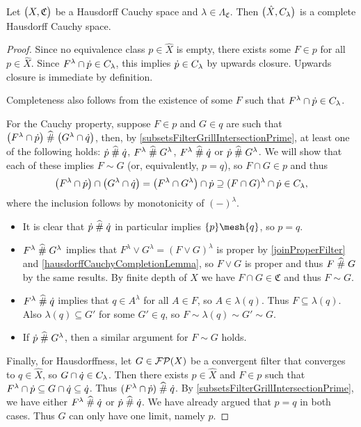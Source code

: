 \begin{proposition}
Let $\sSet[\big]{X, \mathfrak{C}}$ be a Hausdorff Cauchy space and $\lambda \in \Lambda_\mathfrak{C}$. Then $\sSet[\big]{\hat{X}, C_\lambda}$ is a complete Hausdorff Cauchy space.
\end{proposition}
\begin{proof}
Since no equivalence class $p\in \hat{X}$ is empty, there exists some $F\in p$ for all $p\in \hat{X}$. Since $F^\lambda\cap \dot{p}\in C_\lambda$, this implies $\dot{p}\in C_\lambda$ by upwards closure. Upwards closure is immediate by definition.

Completeness also follows from the existence of some $F$ such that $F^\lambda\cap \dot{p}\in C_\lambda$.

For the Cauchy property, suppose $F \in p$ and $G\in q$ are such that $\big(F^\lambda \cap \dot{p}\big) \mathrel{\widehat{\#}} \big(G^\lambda \cap \dot{q}\big)$, then, by \ref{subsetsFilterGrillIntersectionPrime}, at least one of the following holds: $\dot{p}\mathrel{\widehat{\#}} \dot{q}$, $F^\lambda \mathrel{\widehat{\#}} G^\lambda$, $F^\lambda \mathrel{\widehat{\#}} \dot{q}$ or $\dot{p} \mathrel{\widehat{\#}} G^\lambda$. We will show that each of these implies $F\sim G$ (or, equivalently, $p=q$), so $F\cap G\in p$ and thus
\[ \big(F^\lambda \cap \dot{p}\big) \cap \big(G^\lambda \cap \dot{q}\big) = \big(F^\lambda \cap G^\lambda\big) \cap \dot{p} \supseteq (F\cap G)^\lambda \cap \dot{p} \in C_\lambda, \]
where the inclusion follows by monotonicity of $(-)^\lambda$.
\begin{itemize}
\item It is clear that $\dot{p}\mathrel{\widehat{\#}} \dot{q}$ in particular implies $\{p\}\mesh \{q\}$, so $p=q$. 
\item $F^\lambda \mathrel{\widehat{\#}} G^\lambda$ implies that $F^\lambda \vee G^\lambda = (F\vee G)^\lambda$ is proper by \ref{joinProperFilter} and \ref{hausdorffCauchyCompletionLemma}, so $F\vee G$ is proper and thus $F\mathrel{\widehat{\#}} G$ by the same results. By finite depth of $X$ we have $F\cap G\in \mathfrak{C}$ and thus $F\sim G$.
\item $F^\lambda \mathrel{\widehat{\#}} \dot{q}$ implies that $q\in A^\lambda$ for all $A\in F$, so $A\in \lambda(q)$. Thus $F\subseteq \lambda(q)$. Also $\lambda(q)\subseteq G'$ for some $G'\in q$, so $F\sim \lambda(q) \sim G' \sim G$.
\item If $\dot{p} \mathrel{\widehat{\#}} G^\lambda$, then a similar argument for $F\sim G$ holds.
\end{itemize}
Finally, for Hausdorffness, let $G\in \operatorname{\mathcal{FP}}(X)$ be a convergent filter that converges to $q\in \hat{X}$, so $G\cap \dot{q} \in C_\lambda$. Then there exists $p\in \hat{X}$ and $F\in p$ such that $F^\lambda \cap \dot{p} \subseteq G\cap \dot{q} \subseteq \dot{q}$. Thus $(F^\lambda \cap \dot{p})\mathrel{\widehat{\#}} \dot{q}$. By \ref{subsetsFilterGrillIntersectionPrime}, we have either $F^\lambda \mathrel{\widehat{\#}} \dot{q}$ or $\dot{p}\mathrel{\widehat{\#}} \dot{q}$. We have already argued that $p = q$ in both cases. Thus $G$ can only have one limit, namely $p$.
\end{proof}

